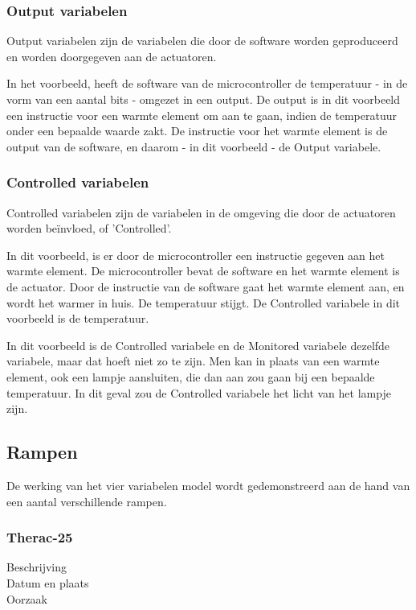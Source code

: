 \documentclass{article}
\begin{document}
			\subsubsection{Output variabelen}
			
			Output variabelen zijn de variabelen die door de software worden geproduceerd en worden doorgegeven aan de actuatoren.

			In het voorbeeld, heeft de software van de microcontroller de temperatuur - in de vorm van een aantal bits - omgezet in een output. De output is in dit voorbeeld een instructie voor een warmte element om aan te gaan, indien de temperatuur onder een bepaalde waarde zakt. De instructie voor het warmte element is de output van de software, en daarom - in dit voorbeeld - de Output variabele.

			\subsubsection{Controlled variabelen}

			Controlled variabelen zijn de variabelen in de omgeving die door de actuatoren worden beïnvloed, of 'Controlled'.

			In dit voorbeeld, is er door de microcontroller een instructie gegeven aan het warmte element. De microcontroller bevat de software en het warmte element is de actuator. Door de instructie van de software gaat het warmte element aan, en wordt het warmer in huis. De temperatuur stijgt. De Controlled variabele in dit voorbeeld is de temperatuur.

			
			In dit voorbeeld is de Controlled variabele en de Monitored variabele dezelfde variabele, maar dat hoeft niet zo te zijn. Men kan in plaats van een warmte element, ook een lampje aansluiten, die dan aan zou gaan bij een bepaalde temperatuur. In dit geval zou de Controlled variabele het licht van het lampje zijn.
		
		\subsection{Rampen}
		
		De werking van het vier variabelen model wordt gedemonstreerd aan de hand van een aantal verschillende rampen.
		
			\subsubsection{Therac-25}
			\begin{description}
				\item[Beschrijving] 
				
				\item[Datum en plaats] 
				
				\item[Oorzaak]
				
			\end{description}
			
\end{document}

